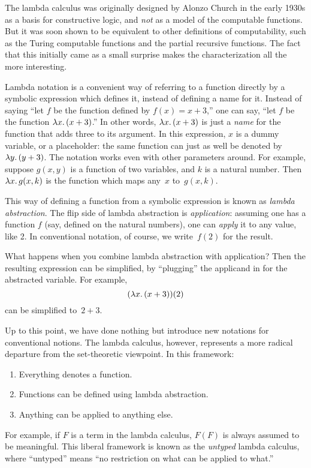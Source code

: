 \documentclass[../../../include/open-logic-section]{subfiles}
\begin{document}

The lambda calculus was originally designed by Alonzo Church in the
early 1930s as a basis for constructive logic, and \emph{not} as a
model of the computable functions. But it was soon shown to be
equivalent to other definitions of computability, such as the Turing
computable functions and the partial recursive functions. The fact
that this initially came as a small surprise makes the
characterization all the more interesting.

Lambda notation is a convenient way of referring to a function
directly by a symbolic expression which defines it, instead of
defining a name for it. Instead of saying ``let $f$ be the function
defined by $f(x) = x + 3$,'' one can say, ``let $f$ be the function
$\lambd[x][(x + 3)]$.''  In other words, $\lambd[x][(x+3)]$ is just a
\emph{name} for the function that adds three to its argument. In this
expression, $x$ is a dummy variable, or a placeholder: the same
function can just as well be denoted by $\lambd[y][(y + 3)]$. The
notation works even with other parameters around. For example, suppose
$g(x, y)$ is a function of two variables, and $k$ is a natural
number. Then $\lambd[x][g(x,k)]$ is the function which maps any~$x$
to~$g(x, k)$.

This way of defining a function from a symbolic expression is known as
\emph{lambda abstraction}. The flip side of lambda abstraction is
\emph{application}: assuming one has a function $f$ (say, defined on
the natural numbers), one can \emph{apply} it to any value, like 2. In
conventional notation, of course, we write~$f(2)$ for the result.

What happens when you combine lambda abstraction with application?
Then the resulting expression can be simplified, by ``plugging'' the
applicand in for the abstracted variable. For example,
\[
(\lambd[x][(x + 3)])(2)
\]
can be simplified to~$2 + 3$.

Up to this point, we have done nothing but introduce new notations for
conventional notions. The lambda calculus, however, represents a more
radical departure from the set-theoretic viewpoint. In this framework:
\begin{enumerate}
\item Everything denotes a function.
\item Functions can be defined using lambda abstraction.
\item Anything can be applied to anything else.
\end{enumerate}
For example, if $F$ is a term in the lambda calculus, $F(F)$ is always
assumed to be meaningful. This liberal framework is known as the
\emph{untyped} lambda calculus, where ``untyped'' means ``no
restriction on what can be applied to what.''
\end{document}
